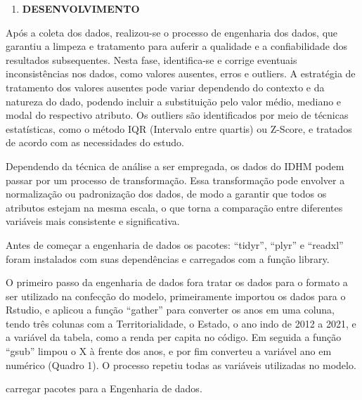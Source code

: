 \documentclass[
]{article}
\providecommand{\tightlist}{%
  \setlength{\itemsep}{0pt}\setlength{\parskip}{0pt}}
\begin{document}
\begin{enumerate}
\def\labelenumi{\arabic{enumi}.}
\setcounter{enumi}{3}
\tightlist
\item
  \textbf{DESENVOLVIMENTO}
\end{enumerate}

Após a coleta dos dados, realizou-se o processo de engenharia dos dados,
que garantiu a limpeza e tratamento para auferir a qualidade e a
confiabilidade dos resultados subsequentes. Nesta fase, identifica-se e
corrige eventuais inconsistências nos dados, como valores ausentes,
erros e outliers. A estratégia de tratamento dos valores ausentes pode
variar dependendo do contexto e da natureza do dado, podendo incluir a
substituição pelo valor médio, mediano e modal do respectivo atributo.
Os outliers são identificados por meio de técnicas estatísticas, como o
método IQR (Intervalo entre quartis) ou Z-Score, e tratados de acordo
com as necessidades do estudo.

Dependendo da técnica de análise a ser empregada, os dados do IDHM podem
passar por um processo de transformação. Essa transformação pode
envolver a normalização ou padronização dos dados, de modo a garantir
que todos os atributos estejam na mesma escala, o que torna a comparação
entre diferentes variáveis mais consistente e significativa.

Antes de começar a engenharia de dados os pacotes: ``tidyr'', ``plyr'' e
``readxl'' foram instalados com suas dependências e carregados com a
função library.

O primeiro passo da engenharia de dados fora tratar os dados para o
formato a ser utilizado na confecção do modelo, primeiramente importou
os dados para o Rstudio, e aplicou a função ``gather'' para converter os
anos em uma coluna, tendo três colunas com a Territorialidade, o Estado,
o ano indo de 2012 a 2021, e a variável da tabela, como a renda per
capita no código. Em seguida a função ``gsub'' limpou o X à frente dos
anos, e por fim converteu a variável ano em numérico (Quadro 1). O
processo repetiu todas as variáveis utilizadas no modelo.

carregar pacotes para a Engenharia de dados.
\end{document}
